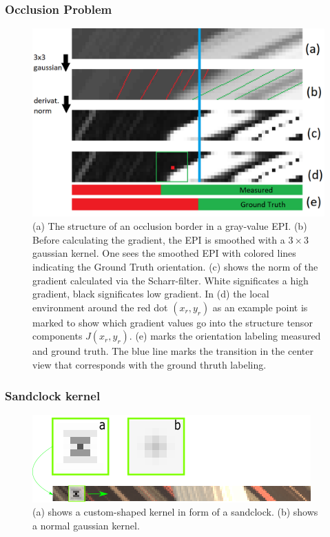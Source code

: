 \documentclass[11pt]{beamer}
\begin{document}
\begin{frame}
\frametitle{Occlusion Problem}
\begin{figure}
	\centering
	\includegraphics[width=0.7\linewidth]{images/occlusion_painted2}
	\caption[Occlusion in an EPI]{(a) The structure of an occlusion border in a gray-value EPI. (b) Before calculating the gradient, the EPI is smoothed with a $3 \times 3$ gaussian kernel. One sees the smoothed EPI with colored lines indicating the Ground Truth orientation. (c) shows the norm of the gradient calculated via the Scharr-filter. White significates a high gradient, black significates low gradient. In (d) the local environment around the red dot $(x_r,y_r)$ as an example point is marked to show which gradient values go into the structure tensor components $J(x_r,y_r)$. (e) marks the orientation labeling measured and ground truth. The blue line marks the transition in the center view that corresponds with the ground thruth labeling. }
	\label{fig:occlusion}
\end{figure}
\end{frame}

\begin{frame}
\frametitle{Sandclock kernel}
\begin{figure}
	\centering
	\includegraphics[width=0.7\linewidth]{images/sandclock.png}
	\caption[Sandclock Kernel]{(a) shows a custom-shaped kernel in form of a sandclock. (b) shows a normal gaussian kernel.}
	\label{fig:sandclock}
\end{figure}
\end{frame}
\end{document}
